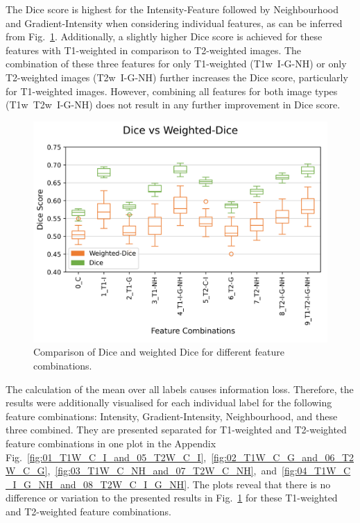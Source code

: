 \documentclass[conference]{IEEEtran}
\begin{document}
The Dice score is highest for the Intensity-Feature followed by Neighbourhood and Gradient-Intensity when considering individual features, as can be inferred from Fig.~\ref{fig:diceScore}. Additionally, a slightly higher Dice score is achieved for these features with T1-weighted in comparison to T2-weighted images. The combination of these three features for only T1-weighted (T1w~I-G-NH) or only T2-weighted images (T2w~I-G-NH) further increases the Dice score, particularly for T1-weighted images. However, combining all features for both image types (T1w~T2w~I-G-NH) does not result in any further improvement in Dice score.

\begin{figure}[h!]
  \centering
  \includegraphics[width=0.95\linewidth, trim={0 4mm 0 10mm}, clip]{diceStuffZoomed}
  \caption{Comparison of Dice and weighted Dice for different feature combinations.}
  \label{fig:diceScore}
\end{figure}

The calculation of the mean over all labels causes information loss. Therefore, the results were additionally visualised for each individual label for the following feature combinations: Intensity, Gradient-Intensity, Neighbourhood, and these three combined. They are presented separated for T1-weighted and T2-weighted feature combinations in one plot in the Appendix Fig.~\ref{fig:01_T1W_C_I_and_05_T2W_C_I},~\ref{fig:02_T1W_C_G_and_06_T2W_C_G},~\ref{fig:03_T1W_C_NH_and_07_T2W_C_NH},~and~\ref{fig:04_T1W_C_I_G_NH_and_08_T2W_C_I_G_NH}. The plots reveal that there is no difference or variation to the presented results in Fig.~\ref{fig:diceScore} for these T1-weighted and T2-weighted feature combinations.
\end{document}
